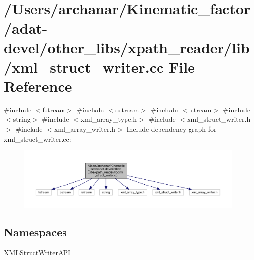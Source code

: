 \hypertarget{adat-devel_2other__libs_2xpath__reader_2lib_2xml__struct__writer_8cc}{}\section{/\+Users/archanar/\+Kinematic\+\_\+factor/adat-\/devel/other\+\_\+libs/xpath\+\_\+reader/lib/xml\+\_\+struct\+\_\+writer.cc File Reference}
\label{adat-devel_2other__libs_2xpath__reader_2lib_2xml__struct__writer_8cc}
{\ttfamily \#include $<$fstream$>$}\newline
{\ttfamily \#include $<$ostream$>$}\newline
{\ttfamily \#include $<$istream$>$}\newline
{\ttfamily \#include $<$string$>$}\newline
{\ttfamily \#include $<$xml\+\_\+array\+\_\+type.\+h$>$}\newline
{\ttfamily \#include $<$xml\+\_\+struct\+\_\+writer.\+h$>$}\newline
{\ttfamily \#include $<$xml\+\_\+array\+\_\+writer.\+h$>$}\newline
Include dependency graph for xml\+\_\+struct\+\_\+writer.\+cc\+:
\nopagebreak
\begin{figure}[H]
\begin{center}
\leavevmode
\includegraphics[width=350pt]{de/dce/adat-devel_2other__libs_2xpath__reader_2lib_2xml__struct__writer_8cc__incl}
\end{center}
\end{figure}
\subsection*{Namespaces}
\begin{DoxyCompactItemize}
\item 
 \mbox{\hyperlink{namespaceXMLStructWriterAPI}{X\+M\+L\+Struct\+Writer\+A\+PI}}
\end{DoxyCompactItemize}
